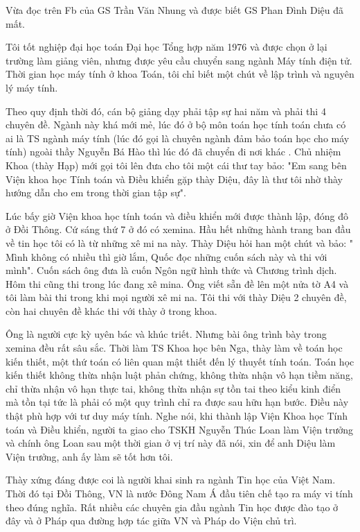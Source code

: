 
Vừa đọc trên Fb của GS Trần Văn Nhung và được biết GS Phan Đình Diệu đã mất. 

Tôi tốt nghiệp đại học toán Đại học Tổng hợp năm 1976 và được chọn ở lại trường làm giảng viên, nhưng được yêu cầu chuyển sang ngành Máy tính điện tử. Thời gian học máy tính ở khoa Toán, tôi chỉ biết một chút về lập trình và nguyên lý máy tính. 

Theo quy định thời đó, cán bộ giảng dạy phải tập sự hai năm và phải thi 4 chuyên đề. Ngành này khá mới mẻ, lúc đó ở bộ môn toán học tính toán chưa có ai là TS ngành máy tính (lúc đó gọi là chuyên ngành đảm bảo toán học cho máy tính) ngoài thầy Nguyễn Bá Hào thì lúc đó đã chuyển đi nơi khác . Chủ nhiệm Khoa (thày Hạp) mới gọi tôi lên đưa cho tôi một cái thư tay bảo: "Em sang bên Viện khoa học Tính toán và Điều khiển gặp thày Diệu, đây là thư tôi nhờ thày hướng dẫn cho em trong thời gian tập sự". 

Lúc bấy giờ Viện khoa học tính toán và điều khiển mới được thành lập, đóng đô ở Đồi Thông. Cứ sáng thứ 7 ở đó có xemina. Hầu hết những hành trang ban đầu về tin học tôi có là từ những xê mi na này. Thày Diệu hỏi han một chút và bảo: " Mình không có nhiều thì giờ lắm, Quốc đọc những cuốn sách này và thi với mình". Cuốn sách ông đưa là cuốn Ngôn ngữ hình thức và Chương trình dịch.   Hôm thi cũng thi trong lúc đang xê mina. Ông viết sẵn đề lên một nửa tờ A4 và tôi làm bài thi trong khi mọi người xê mi na. Tôi thi với thày Diệu 2 chuyên đề, còn hai chuyên đề khác thi với thày ở trong khoa.

Ông là người cực kỳ uyên bác và khúc triết. Nhưng bài ông trình bày trong xemina đều rất sâu sắc. Thời làm TS Khoa học bên Nga, thày làm về toán học kiến thiết, một thứ toán có liên quan mật thiết đến lý thuyết tính toán. Toán học kiến thiết không thừa nhận luật phản chứng, không thừa nhận vô hạn tiềm năng, chỉ thừa nhận vô hạn thực tai, không thừa nhận sự tồn tai theo kiểu kinh điển mà tồn tại tức là phải có một quy trình chỉ ra được sau hữu hạn bước. Điều này thật phù hợp với tư duy máy tính. Nghe nói, khi thành lập Viện Khoa học Tính toán và Điều khiển, người ta giao cho TSKH Nguyễn Thúc Loan làm Viện trưởng và chính ông Loan sau một thời gian ở vị trí này đã nói, xin để anh Diệu làm Viện trưởng, anh ấy làm sẽ tốt hơn tôi.

Thày xứng đáng được coi là người khai sinh ra ngành Tin học của Việt Nam. Thời đó tại Đồi Thông, VN là nước Đông Nam Á đầu tiên chế tạo ra máy vi tính theo đúng nghĩa. Rất nhiều các chuyên gia đầu ngành Tin học được đào tạo ở đây và ở Pháp qua đường hợp tác giữa VN và Pháp do Viện chủ trì.

